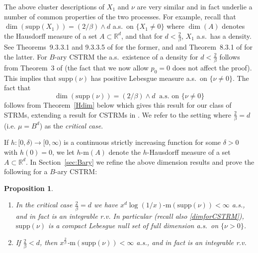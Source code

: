 \documentclass[12pt]{article}
\newtheorem{proposition}[theorem]{Proposition}
\numberwithin{theorem}{section}
\theoremstyle{def}
\numberwithin{equation}{section}
\newcommand{\R}{\mathbb{R}}
\newcommand{\supp}{\mathrm{supp}}
\begin{document}
The above cluster descriptions of $X_1$ and $\nu$ are very similar and in fact underlie a number of common properties of the two processes.  
For example, recall that $\dim(\supp(X_1))=(2/\beta)\wedge d$ a.s.\ on $\{X_1\neq 0\}$ where $\dim(A)$ denotes the Hausdorff measure of a set $A\subset\R^d$, and that for $d<\frac{2}{\beta}$, $X_1$ a.s.\ has a density. 
See Theorems~9.3.3.1 and 9.3.3.5 of \cite{D93} for the former, and \cite{F88} and Theorem~8.3.1 of \cite{D93} for the latter.  
For $B$-ary CSTRM the a.s.\ existence of a density for $d<\frac{2}{\beta}$ follows from Theorem~3 of \cite{ADHP} (the fact that we now allow $p_0=0$ does not affect the proof).
This implies that $\supp(\nu)$ has positive Lebesgue measure a.s.\ on $\{\nu\neq 0\}$.  The fact that 
\begin{equation}\label{dimforCSTRM}\dim(\supp(\nu))=(2/\beta)\wedge d\ \text{ a.s.\ on $\{\nu\neq 0\}$}
\end{equation}
follows from Theorem~\ref{Hdim} below which gives this result for our class of STRMs, extending a result for CSTRMs in \cite{ADHP}. %
We refer to the setting where $\frac{2}{\beta}=d$ (i.e. $\mu=B^d$) as the \emph{critical case}.

If $h:[0,\delta)\to[0, \infty)$ is a continuous strictly increasing function for some $\delta>0$ with $h(0)=0$, we let $h\text{-}\mathrm{m}(A)$ denote the $h$-Hausdorff measure of a set $A\subset \R^d$. 
In Section~\ref{sec:Bary} we refine the above dimension results and prove the following for a $B$-ary CSTRM:
\begin{proposition}\label{baryhmeas}
\begin{enumerate}[label=\emph{(\alph*)}, ref=(\alph*)]
\item\label{it:baryhmeas:a} In the critical case $\frac{2}{\beta}=d$ we have $x^d \log(1/x)\text{-}\mathrm{m}(\supp(\nu))<\infty$ a.s., and in fact is an integrable r.v.
In particular (recall also \eqref{dimforCSTRM}), $\supp(\nu)$ is a compact Lebesgue null set of full dimension a.s.\ on $\{\nu>0\}$.
\item\label{it:baryhmeas:b} If $\frac{2}{\beta}<d$, then $x^{\frac{2}{\beta}}$-$\mathrm{m}(\supp(\nu))<\infty$ a.s., and in fact is an integrable r.v.
\end{enumerate}
\end{proposition}
\end{document}
